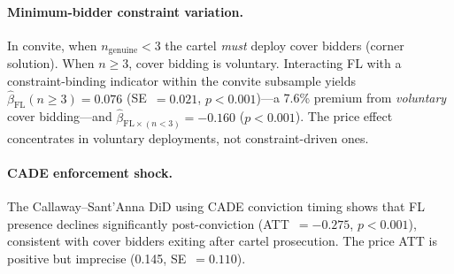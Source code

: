 \paragraph{Minimum-bidder constraint variation.}
In convite, when $n_{\text{genuine}} < 3$ the cartel \emph{must}
deploy cover bidders (corner solution). When $n \geq 3$, cover bidding
is voluntary. Interacting FL with a constraint-binding indicator within
the convite subsample yields $\hat{\beta}_{\text{FL}}(n \geq 3) =
0.076$ (SE~$= 0.021$, $p < 0.001$)---a 7.6\% premium from
\emph{voluntary} cover bidding---and $\hat{\beta}_{\text{FL} \times
(n<3)} = -0.160$ ($p < 0.001$). The price effect concentrates in
voluntary deployments, not constraint-driven ones.

\paragraph{CADE enforcement shock.}
The Callaway--Sant'Anna DiD using CADE conviction timing shows that FL
presence declines significantly post-conviction (ATT~$= -0.275$,
$p < 0.001$), consistent with cover bidders exiting after cartel
prosecution. The price ATT is positive but imprecise (0.145,
SE~$= 0.110$).
